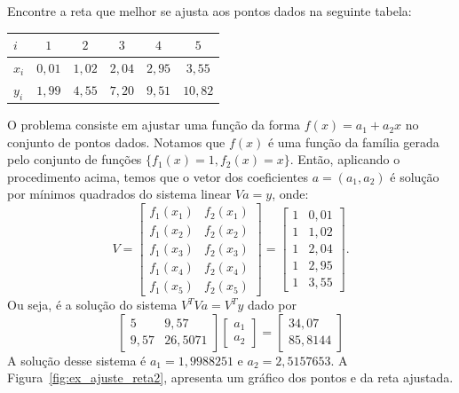 \begin{ex}\label{ex:ajuste_reta2} Encontre a reta que melhor se ajusta aos pontos dados na seguinte tabela:
  \begin{center}
    \begin{tabular}{l|ccccc}
      $i$ & $1$   & $2$  & $3$ & $4$ & $5$\\\hline
      $x_i$& $0,01$ & $1,02$ & $2,04$ & $2,95$ & $3,55$\\
      $y_i$ & $1,99$ & $4,55$ & $7,20$ & $9,51$ & $10,82$
    \end{tabular}
  \end{center}
\end{ex}
\begin{sol}
O problema consiste em ajustar uma função da forma $f(x) = a_1 + a_2x$ no conjunto de pontos dados. Notamos que $f(x)$ é uma função da família gerada pelo conjunto de funções $\{f_1(x) = 1, f_2(x) = x\}$. Então, aplicando o procedimento acima, temos que o vetor dos coeficientes $a = (a_1, a_2)$ é solução por mínimos quadrados do sistema linear $Va = y$, onde:
\begin{equation*}
  V = \begin{bmatrix}
    f_1(x_1) & f_2(x_1)\\
    f_1(x_2) & f_2(x_2)\\
    f_1(x_3) & f_2(x_3)\\
    f_1(x_4) & f_2(x_4)\\
    f_1(x_5) & f_2(x_5)
  \end{bmatrix}
= \begin{bmatrix}
    1 &0,01\\
    1 &1,02\\
    1 &2,04\\
    1 &2,95\\
    1 &3,55
\end{bmatrix}.
\end{equation*}
Ou seja, é a solução do sistema $V^TVa = V^Ty$ dado por
\begin{equation*}
  \begin{bmatrix}
    5     & 9,57 \\
    9,57  & 26,5071
  \end{bmatrix}
  \begin{bmatrix}
    a_1   \\
    a_2
  \end{bmatrix}=
  \begin{bmatrix}
    34,07  \\
    85,8144
  \end{bmatrix}
\end{equation*}
A solução desse sistema é $a_1 = 1,9988251$ e $a_2 = 2,5157653$. A Figura~\ref{fig:ex_ajuste_reta2}, apresenta um gráfico dos pontos e da reta ajustada.


\end{sol}
